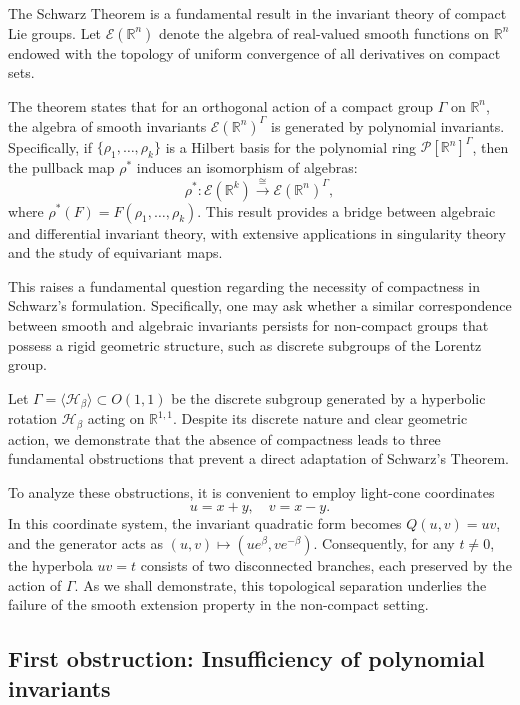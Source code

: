 \documentclass[]{article}
\begin{document}
The Schwarz Theorem is a fundamental result in the invariant theory of compact Lie groups. Let $\mathcal{E}(\mathbb{R}^n)$ denote the algebra of real-valued smooth functions on $\mathbb{R}^n$ endowed with the topology of uniform convergence of all derivatives on compact sets. 

The theorem states that for an orthogonal action of a compact group $\Gamma$ on $\mathbb{R}^n$, the algebra of smooth invariants $\mathcal{E}(\mathbb{R}^n)^\Gamma$ is generated by polynomial invariants. Specifically, if $\{\rho_1, \ldots, \rho_k\}$ is a Hilbert basis for the polynomial ring $\mathcal{P}[\mathbb{R}^n]^\Gamma$, then the pullback map $\rho^*$ induces an isomorphism of algebras:
$$\rho^* : \mathcal{E}(\mathbb{R}^k) \xrightarrow{\cong} \mathcal{E}(\mathbb{R}^n)^\Gamma,$$
where $\rho^*(F) = F(\rho_1, \ldots, \rho_k)$. This result provides a bridge between algebraic and differential invariant theory, with extensive applications in singularity theory and the study of equivariant maps.

This raises a fundamental question regarding the necessity of compactness in Schwarz's formulation. Specifically, one may ask whether a similar correspondence between smooth and algebraic invariants persists for non-compact groups that possess a rigid geometric structure, such as discrete subgroups of the Lorentz group.

Let $\Gamma = \langle \mathcal{H}_\beta \rangle \subset O(1,1)$ be the discrete subgroup generated by a hyperbolic rotation $\mathcal{H}_\beta$ acting on $\mathbb{R}^{1,1}$. Despite its discrete nature and clear geometric action, we demonstrate that the absence of compactness leads to three fundamental obstructions that prevent a direct adaptation of Schwarz's Theorem.

To analyze these obstructions, it is convenient to employ light-cone coordinates
\[
u = x + y, \quad v = x - y.
\]
In this coordinate system, the invariant quadratic form becomes $Q(u,v) = uv$, and the generator acts as $(u, v) \mapsto (u e^\beta, v e^{-\beta})$. Consequently, for any $t \neq 0$, the hyperbola $uv = t$ consists of two disconnected branches, each preserved by the action of $\Gamma$. As we shall demonstrate, this topological separation underlies the failure of the smooth extension property in the non-compact setting.

\bigskip

\subsection{First obstruction: Insufficiency of polynomial invariants}
\end{document}
